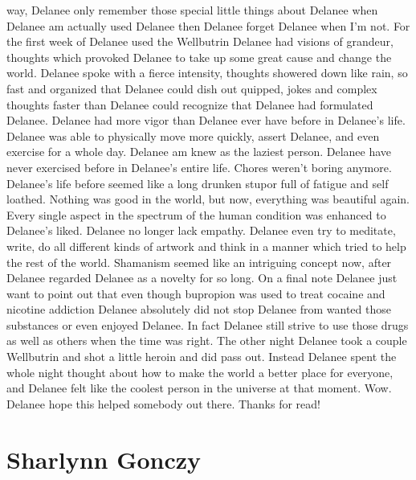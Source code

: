 \documentclass[12pt]{book}
\begin{document}
way, Delanee only remember those special little things about Delanee when Delanee am actually used Delanee then Delanee forget Delanee when I'm not. For the first week of Delanee used the Wellbutrin Delanee had visions of grandeur, thoughts which provoked Delanee to take up some great cause and change the world. Delanee spoke with a fierce intensity, thoughts showered down like rain, so fast and organized that Delanee could dish out quipped, jokes and complex thoughts faster than Delanee could recognize that Delanee had formulated Delanee. Delanee had more vigor than Delanee ever have before in Delanee's life. Delanee was able to physically move more quickly, assert Delanee, and even exercise for a whole day. Delanee am knew as the laziest person. Delanee have never exercised before in Delanee's entire life. Chores weren't boring anymore. Delanee's life before seemed like a long drunken stupor full of fatigue and self loathed. Nothing was good in the world, but now, everything was beautiful again. Every single aspect in the spectrum of the human condition was enhanced to Delanee's liked. Delanee no longer lack empathy. Delanee even try to meditate, write, do all different kinds of artwork and think in a manner which tried to help the rest of the world. Shamanism seemed like an intriguing concept now, after Delanee regarded Delanee as a novelty for so long. On a final note Delanee just want to point out that even though bupropion was used to treat cocaine and nicotine addiction Delanee absolutely did not stop Delanee from wanted those substances or even enjoyed Delanee. In fact Delanee still strive to use those drugs as well as others when the time was right. The other night Delanee took a couple Wellbutrin and shot a little heroin and did pass out. Instead Delanee spent the whole night thought about how to make the world a better place for everyone, and Delanee felt like the coolest person in the universe at that moment. Wow. Delanee hope this helped somebody out there. Thanks for read!



\chapter{Sharlynn Gonczy}
\end{document}
